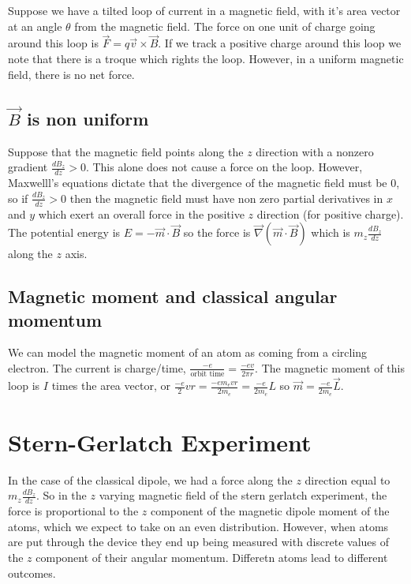 \documentclass{homework}
\begin{document}
Suppose we have a tilted loop of current in a magnetic field, with it's area vector at an angle $\theta$ from the magnetic field. The force on one unit of charge going around this loop is $\vec{F} = q\vec{v} \times \vec{B}$. If we track a positive charge around this loop we note that there is a troque which rights the loop. However, in a uniform magnetic field, there is no net force. 

\subsection{$\vec{B}$ is non uniform}

Suppose that the magnetic field points along the $z$ direction with a nonzero gradient $\frac{dB_z}{dz}>0$. This alone does not cause a force on the loop. However, Maxwelll's equations dictate that the divergence of the magnetic field must be $0$, so if $\frac{dB_z}{dz}>0$ then the magnetic field must have non zero partial derivatives in $x$ and $y$ which exert an overall force in the positive $z$ direction (for positive charge). The potential energy is $E = -\vec{m}\cdot \vec{B}$ so the force is $ \vec{\nabla} (\vec{m} \cdot \vec{B})$ which is $m_z\frac{dB_z}{dz}$ along the $z$ axis.


\subsection{Magnetic moment and classical angular momentum}

We can model the magnetic moment of an atom as coming from a circling electron. The current is charge/time, $\frac{-e}{\text{orbit time}} = \frac{-ev}{2\pi r}$. The magnetic moment of this loop is $I$ times the area vector, or $\frac{-e}{2}vr = \frac{-e m_e vr}{2m_e} = \frac{-e}{2m_e}L$ so $\vec{m} = \frac{-e}{2m_e}\vec{L}$. 


\section{Stern-Gerlatch Experiment}

In the case of the classical dipole, we had a force along the $z$ direction equal to $m_z\frac{dB_z}{dz}$. So in the $z$ varying magnetic field of the stern gerlatch experiment, the force is proportional to the $z$ component of the magnetic dipole moment of the atoms, which we expect to take on an even distribution. However, when atoms are put through the device they end up being measured with discrete values of the $z$ component of their angular momentum. Differetn atoms lead to different outcomes. 
\end{document}
